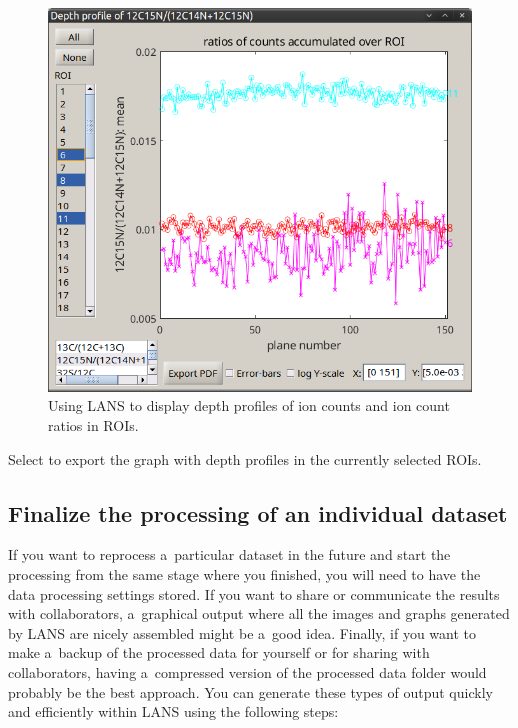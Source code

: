 \begin{figure}[!ht]
\centering
\includegraphics[scale=0.4]{figs3/LANS-depth-profiles}
\caption{\label{fig:depth-profiles}%
Using LANS to display depth profiles of ion counts and ion count ratios in ROIs.}
\end{figure}

\s Select  to export the graph with depth profiles in the currently selected ROIs.


\subsection{Finalize the processing of an individual dataset}
\label{sec:final-steps}
\setcounter{step}{0}

\goldbox{}
If you want to reprocess a~particular dataset in the future and start the processing from the same stage where you finished, you will need to have the data processing settings stored. If you want to share or communicate the results with collaborators, a~graphical output where all the images and graphs generated by LANS are nicely assembled might be a~good idea. Finally, if you want to make a~backup of the processed data for yourself or for sharing with collaborators, having a~compressed version of the processed data folder would probably be the best approach. You can generate these types of output quickly and efficiently within LANS using the following steps:
\tcbe

